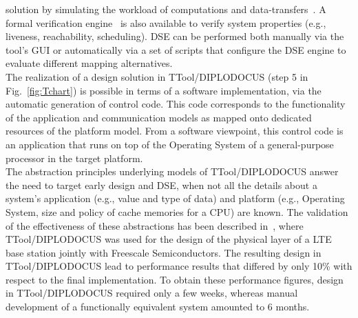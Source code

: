 \documentclass{llncs}
\begin{document}
solution by simulating the workload of computations and data-transfers~\cite{Knorreck11}. A formal verification
engine~\cite{Knorreck11} is also available to verify system properties (e.g., liveness, reachability, scheduling). DSE
can be performed both manually via the tool's GUI or automatically via a set of scripts that configure the DSE engine to
evaluate different mapping alternatives.\\
%
The realization of a design solution in TTool/DIPLODOCUS (step 5 in Fig.~\ref{fig:Tchart}) is possible in terms of a
software implementation, via the automatic generation of control code. This code corresponds to the functionality of
the application and communication models as mapped onto dedicated resources of the platform model. From a software
viewpoint, this control code is an application that runs on top of the Operating System of a general-purpose processor
in the target platform.\\
%
The abstraction principles underlying models of TTool/\-DI\-PLO\-DO\-CUS answer the need to target early design and DSE,
when not all the details about a system's application (e.g., value and type of data) and platform (e.g., Operating
System, size and policy of cache memories for a CPU) are known. The validation of the effectiveness of these
abstractions has been described in~\cite{Jaber2011}, where TTool/DIPLODOCUS was used for the design of the physical
layer of a LTE base station jointly with Freescale Semiconductors. The resulting design in TTool/\-DI\-PLO\-DO\-CUS lead
to performance results that differed by only 10\% with respect to the final implementation. To obtain these performance
figures, design in TTool/\-DI\-PLO\-DO\-CUS required only a few weeks, whereas manual development of a functionally
equivalent system amounted to 6 months.
%
%
%
\newpage
\end{document}
